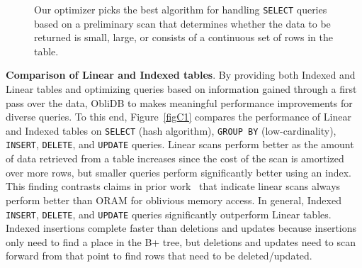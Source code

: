 \documentclass[letterpaper,twocolumn,10pt]{article}
\def\name/{ObliDB}
\begin{document}
\begin{figure}
\small
\centering
{}
\caption{Our optimizer picks the best algorithm for handling \texttt{SELECT} queries based on a preliminary scan that determines whether the data to be returned is small, large, or consists of a continuous set of rows in the table.} 
\label{figC3}
\end{figure}
\noindent \textbf{Comparison of Linear and Indexed tables}.
By providing both Indexed and Linear tables and optimizing queries based on information gained through a first pass over the data, \name/ to makes meaningful performance improvements for diverse queries. To this end, Figure~\ref{figC1} compares the performance of Linear and Indexed tables on \texttt{SELECT} (hash algorithm), \texttt{GROUP BY} (low-cardinality), \texttt{INSERT}, \texttt{DELETE}, and \texttt{UPDATE} queries. Linear scans perform better as the amount of data retrieved from a table increases since the cost of the scan is amortized over more rows, but smaller queries perform significantly better using an index. This finding contrasts claims in prior work~\cite{RLT15} that indicate linear scans always perform better than ORAM for oblivious memory access. In general, Indexed \texttt{INSERT}, \texttt{DELETE}, and \texttt{UPDATE} queries significantly outperform Linear tables. Indexed insertions complete faster than deletions and updates because insertions only need to find a place in the B+ tree, but deletions and updates need to scan forward from that point to find rows that need to be deleted/updated.
\end{document}
